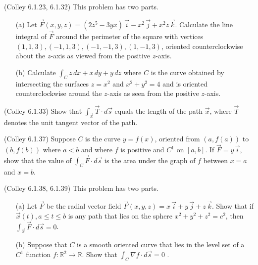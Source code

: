 \documentclass[11pt,letterpaper,cm]{nupset}
\begin{document}
\begin{problem}[Exercise 7] (Colley 6.1.23, 6.1.32) This problem has two parts.
	\begin{itemize}
		\item[(a)] Let $\vec{F}(x,y,z) = (2z^5-3yx)\,\vec{i}-x^2\,\vec{j}+x^2z\,\vec{k}$. Calculate the line integral of $\vec{F}$ around the perimeter of the square with vertices $(1,1,3), (-1,1,3), (-1,-1,3), (1,-1,3)$, oriented counterclockwise about the $z$-axis as viewed from the positive $z$-axis.
		\item[(b)] Calculate $\displaystyle\int_C z\,dx+x\,dy+y\,dz$ where $C$ is the curve obtained by intersecting the surfaces $z=x^2$ and $x^2+y^2=4$ and is oriented counterclockwise around the $z$-axis as seen from the positive $z$-axis.
	\end{itemize}
\end{problem}
\begin{solution}
\end{solution}
\newpage

\begin{problem}[Exercise 8] (Colley 6.1.33) Show that $\displaystyle\int_{\vec{x}} \vec{T}\cdot d\vec{s}$ equals the length of the path $\vec{x}$, where $\vec{T}$ denotes the unit tangent vector of the path.
\end{problem}
\begin{solution}
\end{solution}
\newpage

\begin{problem}[Exercise 9] (Colley 6.1.37) Suppose $C$ is the curve $y=f(x)$, oriented from $(a,f(a))$ to $(b,f(b))$ where $a < b$ and where $f$ is positive and $C^1$ on $[a,b]$. If $\vec{F} = y\,\vec{i}$, show that the value of $\displaystyle\int_C \vec{F}\cdot d\vec{s}$ is the area under the graph of $f$ between $x=a$ and $x=b$.
\end{problem}
\begin{solution}
\end{solution}
\newpage

\begin{problem}[Exercise 10] (Colley 6.1.38, 6.1.39) This problem has two parts.
	\begin{itemize}
		\item[(a)] Let $\vec{F}$ be the radial vector field $\vec{F}(x,y,z) = x\,\vec{i}+y\,\vec{j}+z\,\vec{k}$. Show that if $\vec{x}(t), a \le t \le b$ is any path that lies on the sphere $x^2+y^2+z^2=c^2$, then $\displaystyle\int_{\vec{x}} \vec{F} \cdot d\vec{s} = 0$.
		\item[(b)] Suppose that $C$ is a smooth oriented curve that lies in the level set of a $C^1$ function \newline $f:\mathbb{R}^2\to\mathbb{R}$.  Show that $\displaystyle\int_C \nabla f \cdot d\vec{s} = 0$ .
	\end{itemize}
\end{problem}
\begin{solution}
\end{solution}
\end{document}
